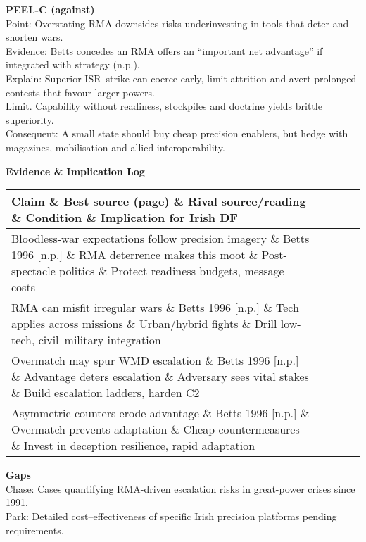 \textbf{PEEL-C (against)}\\
Point: Overstating RMA downsides risks underinvesting in tools that deter and shorten wars.\\
Evidence: Betts concedes an RMA offers an “important net advantage” if integrated with strategy (n.p.).\\
Explain: Superior ISR–strike can coerce early, limit attrition and avert prolonged contests that favour larger powers.\\
Limit. Capability without readiness, stockpiles and doctrine yields brittle superiority.\\
Consequent: A small state should buy cheap precision enablers, but hedge with magazines, mobilisation and allied interoperability.

\textbf{Evidence \& Implication Log}
\begin{tabular}{p{3.2cm}p{4.2cm}p{3.6cm}p{3.2cm}p{4.2cm}}
	\textbf{Claim} \& \textbf{Best source (page)} \& \textbf{Rival source/reading} \& \textbf{Condition} \& \textbf{Implication for Irish DF}\\\hline
	Bloodless-war expectations follow precision imagery \& Betts 1996 [n.p.] \& RMA deterrence makes this moot \& Post-spectacle politics \& Protect readiness budgets, message costs\\
	RMA can misfit irregular wars \& Betts 1996 [n.p.] \& Tech applies across missions \& Urban/hybrid fights \& Drill low-tech, civil–military integration\\
	Overmatch may spur WMD escalation \& Betts 1996 [n.p.] \& Advantage deters escalation \& Adversary sees vital stakes \& Build escalation ladders, harden C2\\
	Asymmetric counters erode advantage \& Betts 1996 [n.p.] \& Overmatch prevents adaptation \& Cheap countermeasures \& Invest in deception resilience, rapid adaptation\\
\end{tabular}

\textbf{Gaps}\\
Chase: Cases quantifying RMA-driven escalation risks in great-power crises since 1991.\\
Park: Detailed cost–effectiveness of specific Irish precision platforms pending requirements.

